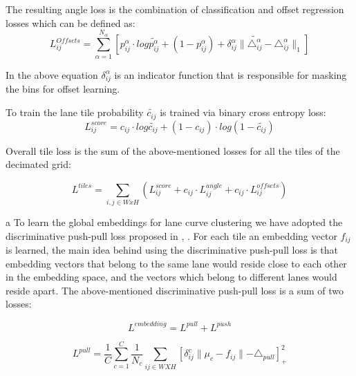             The resulting angle loss is the combination of classification and offset regression losses which can be defined as:
             \begin{equation}
                 L_{ij}^{Offsets} = \sum_{\alpha=1}^{N_{\alpha}}[p^{\alpha}_{ij} \cdot log \tilde{p^{\alpha}_{ij}} + (1 - p^{\alpha}_{ij}) + \delta^{\alpha}_{ij} \parallel   \tilde{\triangle^{\alpha}_{ij}} - \triangle^{\alpha}_{ij} \parallel_{1} ]
             \end{equation}
             
             In the above equation $\delta^{\alpha}_{ij}$ is an indicator function that is responsible for masking the bins for offset learning. 
             
             To train the lane tile probability $\widetilde{c_{ij}}$ is trained via binary cross entropy loss:
             \begin{equation}
                 L_{ij}^{score} = c_{ij} \cdot log \widetilde{c_{ij}} + (1 - c_{ij}) \cdot log
                    (1-  \widetilde{c_{ij}})
             \end{equation}
             
             Overall tile loss is the sum of the above-mentioned losses for all the tiles of the decimated grid:
             
            \begin{equation}
                L^{tiles} = \sum_{i,j \in WxH}(L^{score}_{ij} +c_{ij} \cdot L^{angle}_{ij} + c_{ij} \cdot L^{offsets}_{ij}  )
            \end{equation}
            
         a   To learn the global embeddings for lane curve clustering we have adopted the discriminative push-pull loss proposed in \cite{DBLP:journals/corr/abs-1802-05591} , \cite{DBLP:journals/corr/abs-1708-02551}. For each tile an embedding vector $f_{ij}$ is learned, the main idea behind using the discriminative push-pull loss is that embedding vectors that belong to the same lane would reside close to each other in the embedding space, and the vectors which belong to different lanes would reside apart. The above-mentioned discriminative push-pull loss is a sum of two losses:
            
            \begin{equation}
                L^{embedding} = L^{pull} + L^{push}
            \end{equation}
             
             \begin{equation}
                     L^{pull} = \frac{1}{C} \sum^{C}_{c=1}\frac{1}{N_{c}} \sum_{ij \in WXH}[ \delta_{ij}^{c} \parallel \mu_{c} - f_{ij}  \parallel - \triangle_{pull} ]_{+}^{2} 
             \end{equation}
             
